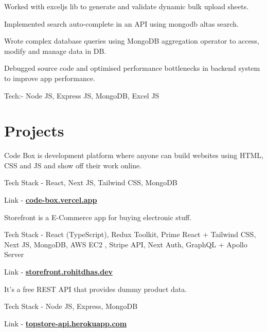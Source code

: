\documentclass[]{deedy-resume-openfont}
\begin{document}
\begin{minipage}[t]{0.66\textwidth}
\begin{tightemize}
\item Worked with exceljs lib to generate and validate dynamic bulk upload sheets.
\item Implemented search auto-complete in an API using mongodb altas search.
\item Wrote complex database queries using MongoDB aggregation operator to access, modify and manage data in DB.
\item Debugged source code and optimised performance bottlenecks in backend system to improve app performance.
\item Tech:- Node JS, Express JS, MongoDB, Excel JS
\end{tightemize}
\sectionsep


\section{Projects}
\descript{}
\location{}
\begin{tightemize}
\item Code Box is development platform where anyone can build websites using HTML, CSS and JS and show off their work online.
\item Tech Stack - React, Next JS, Tailwind CSS, MongoDB
\item Link - \href{https://code-box.vercel.app} {\bf code-box.vercel.app}
\end{tightemize} 
\sectionsep

\descript{}
\location{}
\begin{tightemize}
\item Storefront is a E-Commerce app for buying electronic stuff.
\item Tech Stack - React (TypeScript), Redux Toolkit, Prime React + Tailwind CSS, Next JS, MongoDB, AWS EC2 , Stripe API, Next Auth, GraphQL + Apollo Server
\item Link - \href{https://storefront.rohitdhas.dev} {\bf storefront.rohitdhas.dev}
\end{tightemize} 
\sectionsep

\descript{}
\location{}
\begin{tightemize}
\item It's a free REST API that provides dummy product data.
\item Tech Stack - Node JS, Express, MongoDB
\item Link - \href{https://topstore-api.herokuapp.com} {\bf topstore-api.herokuapp.com}
\end{tightemize} 
\sectionsep

\end{minipage} 
\end{document}
